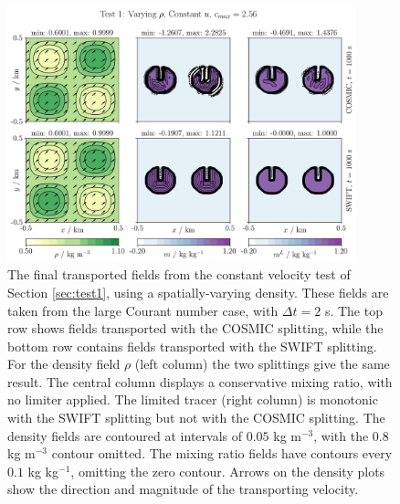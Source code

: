 \documentclass[11pt,a4paper]{article}
\begin{document}
\begin{figure}[h!]
\centering
\includegraphics[width=0.9\textwidth]{fig_2_const_wind.jpg}
\caption{The final transported fields from the constant velocity test of Section \ref{sec:test1}, using a spatially-varying density. These fields are taken from the large Courant number case, with $\Delta t=2$ s. The top row shows fields transported with the COSMIC splitting, while the bottom row contains fields transported with the SWIFT splitting.
For the density field $\rho$ (left column) the two splittings give the same result.
The central column displays a conservative mixing ratio, with no limiter applied.
The limited tracer (right column) is monotonic with the SWIFT splitting but not with the COSMIC splitting.
The density fields are contoured at intervals of $0.05$ kg m$^{-3}$, with the $0.8$ kg m$^{-3}$ contour omitted.
The mixing ratio fields have contours every $0.1$ kg kg$^{-1}$, omitting the zero contour.
Arrows on the density plots show the direction and magnitude of the transporting velocity.}
\label{fig:test1}
\end{figure}
\end{document}
